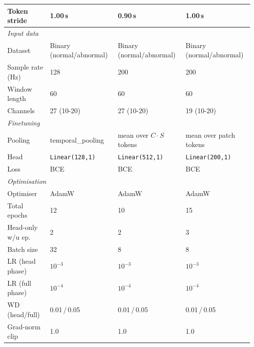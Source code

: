 \documentclass{article}
\begin{document}
\begin{table}[h]
\begin{tabular}{l p{2.8cm} p{3.2cm} p{2.8cm}}
  Token stride            & 1.00\,s              & 0.90\,s                                    & 1.00\,s \\
\midrule
\multicolumn{4}{l}{\emph{Input data}} \\
Dataset             & Binary (normal/abnormal)           & Binary (normal/abnormal)           & Binary (normal/abnormal) \\
Sample rate (Hz)    & 128                & 200                & 200 \\
Window length   & 60                 & 60                 & 60 \\
Channels            & 27 (10-20)   & 27 (10-20)         & 19 (10-20) \\
\midrule
\multicolumn{4}{l}{\emph{Finetuning}} \\
 Pooling          & temporal\_pooling        & mean over $C\!\cdot\!S$ tokens     & mean over patch tokens \\                       
  Head             & \texttt{Linear(128,1)}            & \texttt{Linear(512,1)}             & \texttt{Linear(200,1)} \\                                
  Loss             & BCE & BCE & BCE \\
  \midrule
\multicolumn{4}{l}{\emph{Optimisation}} \\
Optimiser           & AdamW              & AdamW              & AdamW \\
Total epochs        & 12                 & 10                 & 15 \\
Head-only w/u ep.   & 2                  & 2                  & 3 \\
Batch size          & 32                 & 8                  & 8 \\
LR (head phase)     & $10^{-3}$          & $10^{-3}$          & $10^{-3}$ \\
LR (full phase)     & $10^{-4}$          & $10^{-4}$          & $10^{-4}$ \\
WD (head/full)      & 0.01\,/\,0.05      & 0.01\,/\,0.05      & 0.01\,/\,0.05 \\
Grad-norm clip      & 1.0                & 1.0                & 1.0 \\
\bottomrule
\end{tabular}
\end{table}
\end{document}
